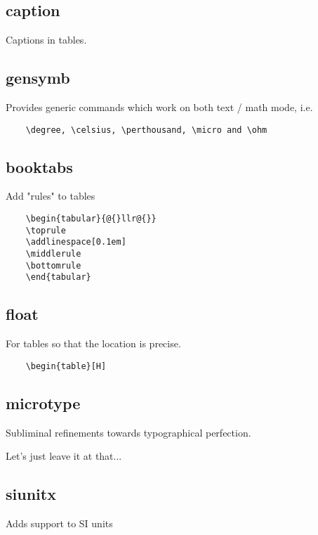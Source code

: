 \documentclass{article}
\begin{document}
\subsection{caption}

Captions in tables.

\subsection{gensymb}

Provides generic commands which work on both text / math mode, i.e.

\begin{verbatim}
	\degree, \celsius, \perthousand, \micro and \ohm
\end{verbatim}

\subsection{booktabs}

Add "rules" to tables

\begin{verbatim}
	\begin{tabular}{@{}llr@{}}
	\toprule
	\addlinespace[0.1em]
	\middlerule
	\bottomrule
	\end{tabular}
\end{verbatim}

\subsection{float}

For tables so that the location is precise.
	
\begin{verbatim}
	\begin{table}[H]
\end{verbatim}


\subsection{microtype}

Subliminal refinements towards typographical perfection.

Let's just leave it at that...

\subsection{siunitx}

Adds support to SI units
\end{document}
